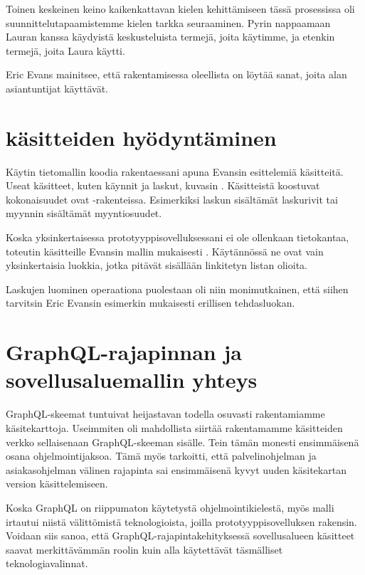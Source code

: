 Toinen keskeinen keino kaikenkattavan kielen kehittämiseen tässä
prosessissa oli suunnittelutapaamistemme kielen tarkka seuraaminen.
Pyrin nappaamaan Lauran kanssa käydyistä keskusteluista termejä, joita
käytimme, ja etenkin termejä, joita Laura käytti.

Eric Evans mainitsee, että 
rakentamisessa oleellista on löytää sanat, joita alan asiantuntijat
käyttävät\cite{evans:ddd}.

\hypertarget{kuxe4sitteiden-hyuxf6dyntuxe4minen}{%
\section{\texorpdfstring{
käsitteiden
hyödyntäminen}{ käsitteiden hyödyntäminen}}\label{kuxe4sitteiden-hyuxf6dyntuxe4minen}}

Käytin tietomallin koodia rakentaessani apuna Evansin esittelemiä
käsitteitä. Useat käsitteet, kuten käynnit ja laskut, kuvasin
. Käsitteistä koostuvat kokonaisuudet
ovat -rakenteissa. Esimerkiksi laskun
sisältämät laskurivit tai myynnin sisältämät myyntiosuudet.

Koska yksinkertaisessa prototyyppisovelluksessani ei ole ollenkaan
tietokantaa, toteutin käsitteille Evansin mallin mukaisesti
. Käytännössä ne ovat vain
yksinkertaisia luokkia, jotka pitävät sisällään linkitetyn listan
olioita.

Laskujen luominen operaationa puolestaan oli niin monimutkainen, että
siihen tarvitsin Eric Evansin esimerkin mukaisesti erillisen
tehdasluokan.

\hypertarget{graphql-rajapinnan-ja-sovellusaluemallin-yhteys}{%
\section{GraphQL-rajapinnan ja sovellusaluemallin
yhteys}\label{graphql-rajapinnan-ja-sovellusaluemallin-yhteys}}

GraphQL-skeemat tuntuivat heijastavan todella osuvasti rakentamiamme
käsitekarttoja. Useimmiten oli mahdollista siirtää rakentamamme
käsitteiden verkko sellaisenaan GraphQL-skeeman sisälle. Tein tämän
monesti ensimmäisenä osana ohjelmointijaksoa. Tämä myös tarkoitti, että
palvelinohjelman ja asiakasohjelman välinen rajapinta sai ensimmäisenä
kyvyt uuden käsitekartan version käsittelemiseen.

Koska GraphQL on riippumaton käytetystä ohjelmointikielestä, myös malli
irtautui niistä välittömistä teknologioista, joilla
prototyyppisovelluksen rakensin. Voidaan siis sanoa, että
GraphQL-rajapintakehityksessä sovellusalueen käsitteet saavat
merkittävämmän roolin kuin alla käytettävät täsmälliset
teknologiavalinnat.

